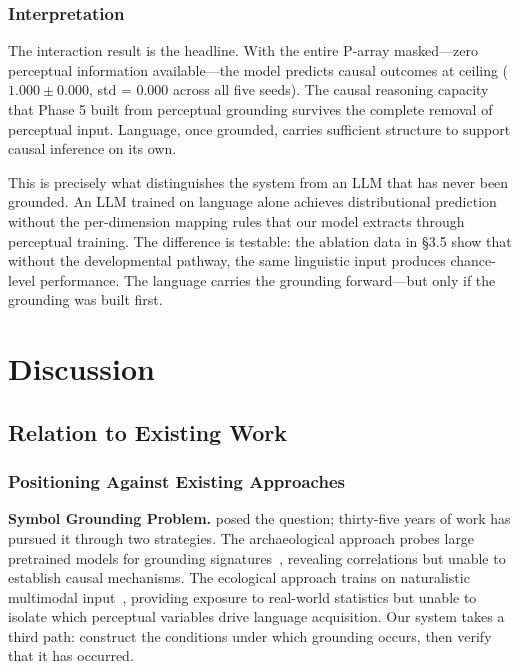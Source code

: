 \documentclass{article}
\begin{document}
\subsubsection{Interpretation}

The interaction result is the headline. With the entire P-array masked---zero perceptual information available---the model predicts causal outcomes at ceiling ($1.000 \pm 0.000$, std = 0.000 across all five seeds). The causal reasoning capacity that Phase 5 built from perceptual grounding survives the complete removal of perceptual input. Language, once grounded, carries sufficient structure to support causal inference on its own.

This is precisely what distinguishes the system from an LLM that has never been grounded. An LLM trained on language alone achieves distributional prediction without the per-dimension mapping rules that our model extracts through perceptual training. The difference is testable: the ablation data in \S3.5 show that without the developmental pathway, the same linguistic input produces chance-level performance. The language carries the grounding forward---but only if the grounding was built first.

\section{Discussion}

\subsection{Relation to Existing Work}

\subsubsection{Positioning Against Existing Approaches}

\textbf{Symbol Grounding Problem.} \citet{harnad1990} posed the question; thirty-five years of work has pursued it through two strategies. The archaeological approach probes large pretrained models for grounding signatures~\citep{wu2025,patel2022}, revealing correlations but unable to establish causal mechanisms. The ecological approach trains on naturalistic multimodal input~\citep{vong2024}, providing exposure to real-world statistics but unable to isolate which perceptual variables drive language acquisition. Our system takes a third path: construct the conditions under which grounding occurs, then verify that it has occurred.
\end{document}

